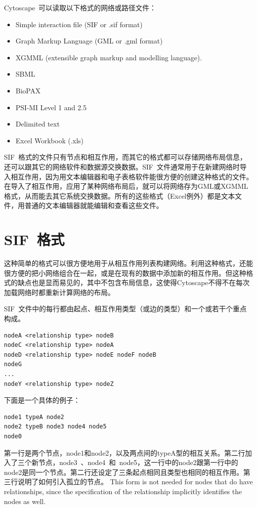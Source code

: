 Cytoscape~可以读取以下格式的网络或路径文件：
\begin{itemize}
\item Simple interaction file (SIF or .sif format) 
\item Graph Markup Language (GML or .gml format) 
\item XGMML (extensible graph markup and modelling language). 
\item SBML 
\item BioPAX 
\item PSI-MI Level 1 and 2.5 
\item Delimited text 
\item Excel Workbook (.xls) 
\end{itemize}

SIF~格式的文件只有节点和相互作用，而其它的格式都可以存储网络布局信息，还可以跟其它的网络软件和数据源交换数据。SIF~文件通常用于在新建网络时导入相互作用，因为用文本编辑器和电子表格软件能很方便的创建这种格式的文件。在导入了相互作用，应用了某种网络布局后，就可以将网络存为GML或XGMML格式，从而能去其它系统交换数据。所有的这些格式（Excel例外）都是文本文件，用普通的文本编辑器就能编辑和查看这些文件。


\section{SIF~格式}
这种简单的格式可以很方便地用于从相互作用列表构建网络。利用这种格式，还能很方便的把小网络组合在一起，或是在现有的数据中添加新的相互作用。但这种格式的缺点也是显而易见的，其中不包含布局信息，这使得Cytoscape不得不在每次加载网络时都重新计算网络的布局。

SIF~文件中的每行都由起点、相互作用类型（或边的类型）和一个或若干个重点构成。
\begin{verbatim}
nodeA <relationship type> nodeB
nodeC <relationship type> nodeA
nodeD <relationship type> nodeE nodeF nodeB
nodeG
...
nodeY <relationship type> nodeZ
\end{verbatim}

下面是一个具体的例子：
 \begin{verbatim}
node1 typeA node2
node2 typeB node3 node4 node5
node0
\end{verbatim}

第一行是两个节点，node1和node2，以及两点间的typeA型的相互关系。第二行加入了三个新节点，node3~、\linebreak node4~和~node5，这一行中的node2跟第一行中的node2是同一个节点。第二行还设定了三条起点相同且类型也相同的相互作用。第三行说明了如何引入孤立的节点。 This form is not needed for nodes that do have relationships, since the specification of the relationship implicitly identifies the nodes as well. 

